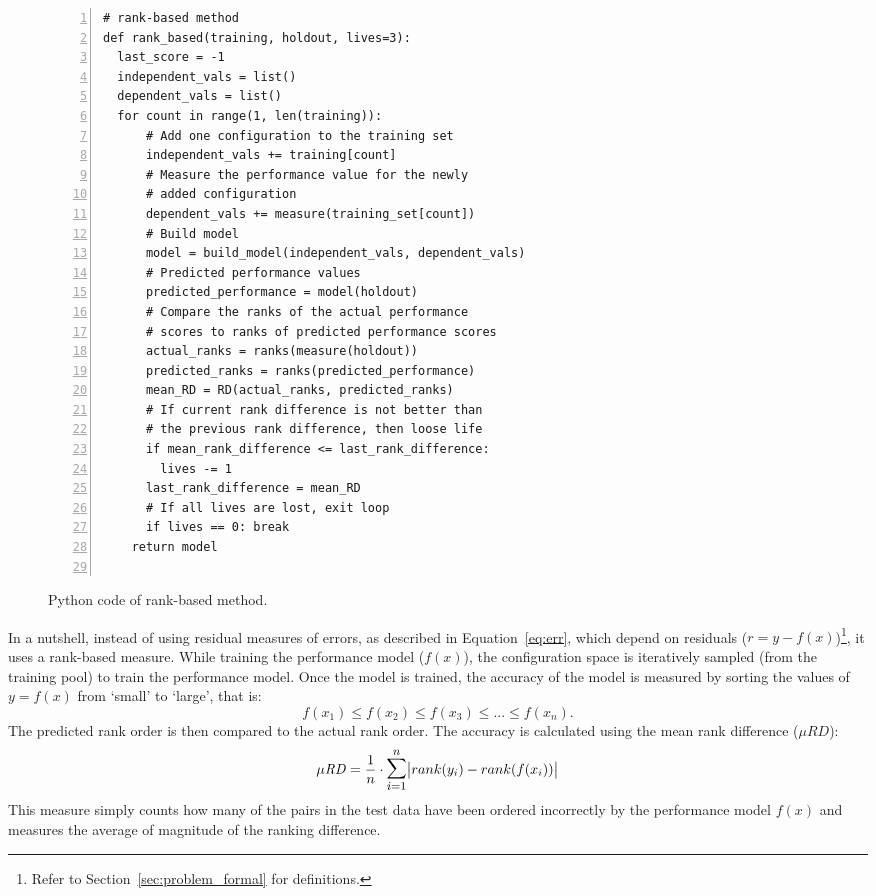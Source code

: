 \begin{figure}[t]
\small
\hspace{0.4cm}\begin{lstlisting}[xleftmargin=5.0ex,mathescape,frame=none,numbers=left]
# rank-based method
def rank_based(training, holdout, lives=3): 
  last_score = -1
  independent_vals = list()
  dependent_vals = list()
  for count in range(1, len(training)):  
      # Add one configuration to the training set
      independent_vals += training[count]      
      # Measure the performance value for the newly
      # added configuration 
      dependent_vals += measure(training_set[count])
      # Build model
      model = build_model(independent_vals, dependent_vals)     
      # Predicted performance values
      predicted_performance = model(holdout) 
      # Compare the ranks of the actual performance 
      # scores to ranks of predicted performance scores
      actual_ranks = ranks(measure(holdout))
      predicted_ranks = ranks(predicted_performance)
      mean_RD = RD(actual_ranks, predicted_ranks)
      # If current rank difference is not better than
      # the previous rank difference, then loose life
      if mean_rank_difference <= last_rank_difference:
        lives -= 1
      last_rank_difference = mean_RD
      # If all lives are lost, exit loop
      if lives == 0: break
    return model
      

\end{lstlisting}
\caption{\small{Python code of rank-based method.}
}
\label{fig:rank-based}  
\end{figure}

In a nutshell, instead of using residual measures of errors, as described in Equation~\ref{eq:err}, which depend on residuals ($r = y - f(x)$)\footnote{Refer to Section~\ref{sec:problem_formal} for definitions.}, it uses a rank-based measure. While training the performance model ($f(x)$), the configuration space is iteratively sampled (from the training pool) to train the performance model. Once the model is trained, the accuracy of the model is measured  by sorting the values of $y=f(x)$ from `small' to `large', that is:
\begin{equation}
    f(x_1) \le f(x_2) \le f(x_3) \le ... \le f(x_n).
\end{equation}
The predicted rank order is then compared to the actual rank order. The accuracy is calculated using the mean rank difference ($\mu RD$):
\begin{equation} \label{eq:rank_performance}
    \mathit{\mu RD} = \frac{1}{n} \cdot \mathlarger{\mathlarger{\sum}}_{i=1}^{n}\abs{rank(y_i) - rank(f(x_i))}
\end{equation}
This measure simply counts how many of the pairs in the test data have been ordered incorrectly by the performance model $f(x)$ and measures the average of magnitude of the ranking difference. 



